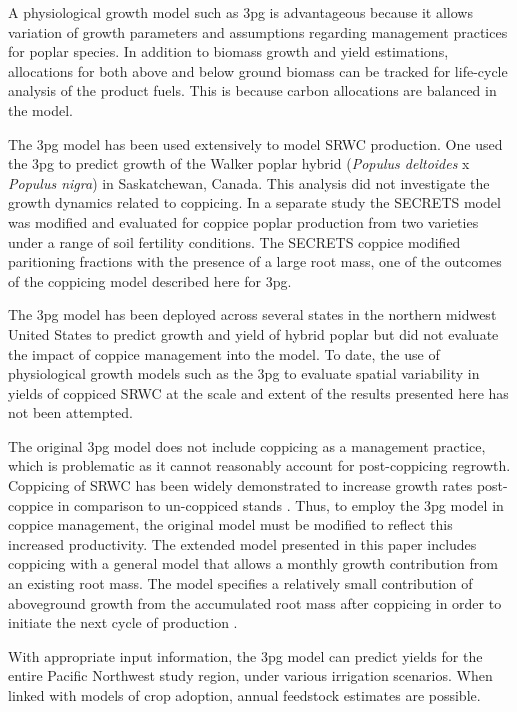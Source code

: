 \documentclass[preprint,12pt]{elsarticle}
\begin{document}
A physiological growth model such as \ac{3pg} is advantageous because
it allows variation of growth parameters and assumptions regarding
management practices for poplar species.  In addition to biomass
growth and yield estimations, allocations for both above and below
ground biomass can be tracked for life-cycle analysis of the product
fuels.  This is because carbon allocations are balanced in the model.

The \ac{3pg} model has been used extensively to model \ac{SRWC}
production. One\cite{Amichev2010} used the \ac{3pg} to predict growth of
the Walker poplar hybrid (\textit{Populus deltoides} x \textit{Populus
  nigra}) in Saskatchewan, Canada. This analysis did not investigate
the growth dynamics related to coppicing. In a separate study
\cite{Deckmyn2004} the \ac{SECRETS} model was modified
and evaluated for coppice poplar production from two
varieties under a range of soil fertility conditions.  The
\ac{SECRETS} coppice modified paritioning fractions with the presence
of a large root mass, one of the outcomes of the coppicing model
described here for \ac{3pg}.

The \ac{3pg} model\cite{Headlee2012} has been deployed across several states
in the northern midwest United States to predict growth and yield of hybrid poplar
but did not evaluate the impact of coppice management into the model.  To date,
the use of physiological growth models such as the \ac{3pg} to
evaluate spatial variability in yields of coppiced \ac{SRWC} at the
scale and extent of the results presented here has not been attempted.

The original \ac{3pg} model does not include coppicing as a management
practice, which is problematic as it cannot reasonably account for
post-coppicing regrowth.  Coppicing of \ac{SRWC} has been widely
demonstrated to increase growth rates post-coppice in comparison to
un-coppiced stands
\cite{Verwijst1996,Afas2008a,Sennerby-Forsse1992}. Thus, to employ the
\ac{3pg} model in coppice management, the original model must be
modified to reflect this increased productivity. The extended model
presented in this paper includes coppicing with a general model that
allows a monthly growth contribution from an existing root mass.  The
model specifies a relatively small contribution of aboveground growth
from the accumulated root mass after coppicing in order to initiate
the next cycle of production \cite{Deckmyn2004}.

With appropriate input information, the \ac{3pg} model can predict
yields for the entire Pacific Northwest study region, under various
irrigation scenarios.  When linked with models of crop adoption,
annual feedstock estimates are possible.
\end{document}
